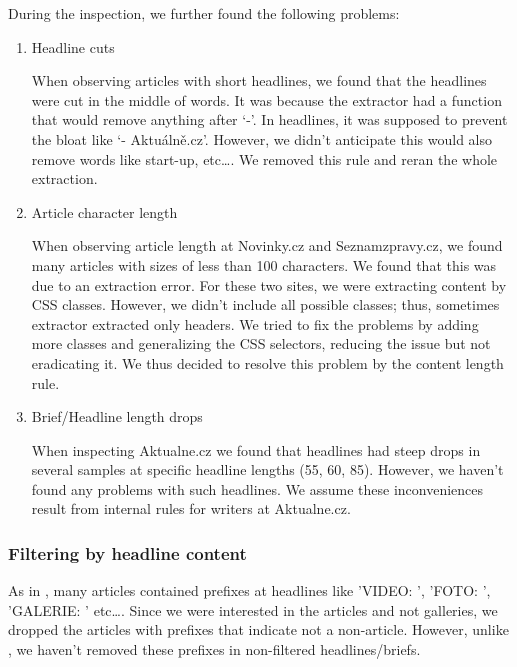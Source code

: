 During the inspection, we further found the following problems:
\begin{enumerate}
    \item Headline cuts

        When observing articles with short headlines, we found that the headlines 
        were cut in the middle of words.
        It was because the extractor had a function that would remove anything after `-'. 
        In headlines, it was supposed to prevent the bloat like `- Aktuálně.cz'. However,
        we didn't anticipate this would also remove words like start-up, etc\dots.
        We removed this rule and reran the whole extraction.
    \item Article character length

        When observing article length at Novinky.cz and Seznamzpravy.cz,
        we found many articles with sizes of less than 100 characters.
        We found that this was due to an extraction error. 
        For these two sites, we were extracting content by CSS classes.
        However, we didn't include all possible classes;
        thus, sometimes extractor extracted only headers. 
        We tried to fix the problems by adding more classes and generalizing the CSS selectors,
        reducing the issue but not eradicating it. We thus decided to resolve this problem
        by the content length rule.

    \item Brief/Headline length drops

        When inspecting Aktualne.cz we found that headlines
        had steep drops in several samples at specific headline lengths (55, 60, 85).
        However, we haven't found any problems with such headlines.
        We assume these inconveniences result from internal rules for writers at Aktualne.cz.
\end{enumerate}

\subsubsection{Filtering by headline content}
As in \cite{strakaSumeCzechLargeCzech2018a}, many articles
contained prefixes at headlines like 'VIDEO: ', 'FOTO: ', 'GALERIE: ' etc\dots.
Since we were interested in the articles and not galleries,
we dropped the articles with prefixes that indicate not a non-article.
However, unlike \cite{strakaSumeCzechLargeCzech2018a}, we haven't removed these prefixes
in non-filtered headlines/briefs.




